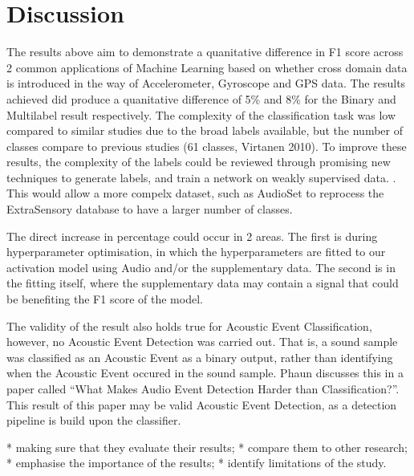 \documentclass{UoNMCHA}
\newcommand{\inlineQuote}[1]{``#1''}
\numberwithin{equation}{section}
\begin{document}
\section{Discussion}\label{sec:Discussion}
The results above aim to demonstrate a quanitative difference in F1 score across 2 common applications of Machine Learning based on whether cross domain data is introduced in the way of Accelerometer, Gyroscope and GPS data. 
The results achieved did produce a quanitative difference of 5\% and 8\% for the Binary and Multilabel result respectively. The complexity of the classification task was low compared to similar studies \cite{Tseng2017} \cite{Virtanen2010} due to the broad labels available, but the number of classes compare to previous studies (61 classes, Virtanen 2010\cite{Virtanen2010}). To improve these results, the complexity of the labels could be reviewed through promising new techniques to generate labels, and train a network on weakly supervised data. \cite{Tseng2017}. This would allow a more compelx dataset, such as AudioSet \cite{Audiosetgoogle2018} to reprocess the ExtraSensory database to have a larger number of classes. 

The direct increase in percentage could occur in 2 areas. The first is during hyperparameter optimisation, in which the hyperparameters are fitted to our activation model using Audio and/or the supplementary data. The second is in the fitting itself, where the supplementary data may contain a signal that could be benefiting the F1 score of the model.

The validity of the result also holds true for Acoustic Event Classification, however, no Acoustic Event Detection was carried out. That is, a sound sample was classified as an Acoustic Event as a binary output, rather than identifying when the Acoustic Event occured in the sound sample. Phaun discusses this in a paper called \inlineQuote{What Makes Audio Event Detection Harder than Classification?}\cite{Phan2016}. This result of this paper may be valid Acoustic Event Detection, as a detection pipeline is build upon the classifier.

* making sure that they evaluate their results;
* compare them to other research;
* emphasise the importance of the results;
* identify limitations of the study.
\end{document}
